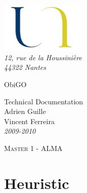 \documentclass[11pt,a4paper]{report}
\begin{document}
\begin{titlepage}



	\begin{flushleft}
		 \includegraphics*[width=4cm]{images/logo.jpg} \\
		 \textsl{12, rue de la Houssinière}\\
		 \textit{44322 Nantes}
		\hrulefill
	\end{flushleft}


	\vspace{2cm}


	\begin{flushleft}

		{\fontsize{1.4cm}{1.65cm}\selectfont ObiGO  } 	 \\ 
	
		\vspace{1cm}
	
		{\Large Technical Documentation}\\
	
		\vspace{1cm}
		Adrien Guille \\
		Vincent Ferreira \\
		\textit{2009-2010}
	
	\end{flushleft}

	\vspace{2cm}

	\begin{flushleft}
	 	\textsc{Master 1 - ALMA}\\	
	 	\hrulefill
	\end{flushleft}


\end{titlepage}

\tableofcontents

\chapter*{Heuristic}
\end{document}
